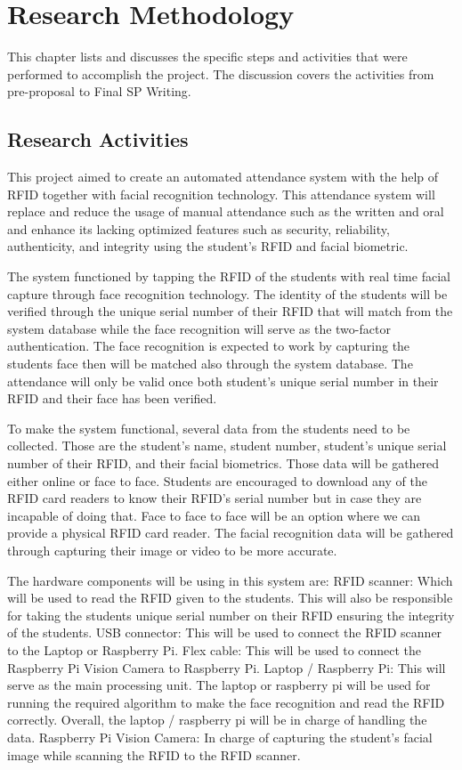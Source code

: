 \chapter{Research Methodology}
This chapter lists and discusses the specific steps and activities that were performed  to accomplish the project. 
The discussion covers the activities from pre-proposal to Final SP Writing.

\section{Research Activities}
This project aimed to create an automated attendance system with the help of RFID together with facial recognition technology. This attendance system will replace and reduce the usage of manual attendance such as the written and oral and enhance its lacking optimized features such as security, reliability, authenticity, and integrity using the student’s RFID and facial biometric.

The system functioned by tapping the RFID of the students with real time facial capture through face recognition technology. The identity of the students will be verified through the unique serial number of their RFID that will match from the system database while the face recognition will serve as the two-factor authentication. The face recognition is expected to work by capturing the students face then will be matched also through the system database. The attendance will only be valid once both student’s unique serial number in their RFID and their face has been verified.

To make the system functional, several data from the students need to be collected. Those are the student’s name, student number, student’s unique serial number of  their RFID, and their facial biometrics. Those data will be gathered either online or face to face. Students are encouraged to download any of the RFID card readers to know their RFID’s serial number but in case they are incapable of doing that. Face to face to face will be an option where we can provide a physical RFID card reader. The facial recognition data will be gathered through capturing their image or video to be more accurate. 

The hardware components will be using in this system are:
RFID scanner: Which will be used to read the RFID given to the students. This will also be responsible for taking the students unique serial number on their RFID ensuring the integrity of the students.
USB connector: This will be used to connect the RFID scanner to the Laptop or Raspberry Pi. Flex cable: This will be used to connect the Raspberry Pi Vision Camera to Raspberry Pi.
Laptop / Raspberry Pi: This will serve as the main processing unit. The laptop or raspberry pi will be used for running the required algorithm to make the face recognition and read the RFID correctly. Overall, the laptop / raspberry pi will be in charge of handling the data.
Raspberry Pi Vision Camera: In charge of capturing the student’s facial image while scanning the RFID to the RFID scanner. 

